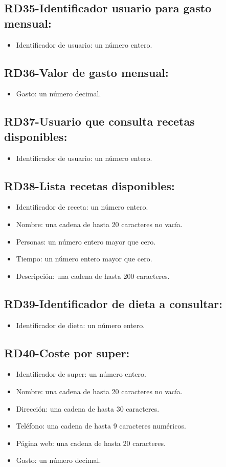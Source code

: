 \documentclass[a4paper,12pt]{report}
\begin{document}
\subsection{RD35-Identificador usuario para gasto mensual:}
\label{sec-2-1-35}
\begin{itemize}
\item Identificador de usuario: un número entero.
\end{itemize}
\subsection{RD36-Valor de gasto mensual:}
\label{sec-2-1-36}
\begin{itemize}
\item Gasto: un número decimal.
\end{itemize}
\subsection{RD37-Usuario que consulta recetas disponibles:}
\label{sec-2-1-37}
\begin{itemize}
\item Identificador de usuario: un número entero.
\end{itemize}
\subsection{RD38-Lista recetas disponibles:}
\label{sec-2-1-38}
\begin{itemize}
\item Identificador de receta: un número entero.
\item Nombre: una cadena de hasta 20 caracteres no vacía.
\item Personas: un número entero mayor que cero.
\item Tiempo: un número entero mayor que cero.
\item Descripción: una cadena de hasta 200 caracteres.
\end{itemize}
\subsection{RD39-Identificador de dieta a consultar:}
\label{sec-2-1-39}
\begin{itemize}
\item Identificador de dieta: un número entero.
\end{itemize}
\subsection{RD40-Coste por super:}
\label{sec-2-1-40}
\begin{itemize}
\item Identificador de super: un número entero.
\item Nombre:  una cadena de hasta 20 caracteres no vacía.
\item Dirección:  una cadena de hasta 30 caracteres.
\item Teléfono: una cadena de hasta 9 caracteres numéricos.
\item Página web: una cadena de hasta 20 caracteres.
\item Gasto: un número decimal.
\end{itemize}
\end{document}
